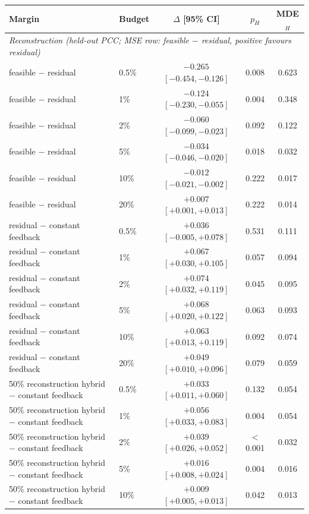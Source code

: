 \begin{tabular}{llccc}
\toprule
Margin & Budget & $\Delta$ [95\% CI] & $p_H$ & MDE$_H$ \\
\midrule
\multicolumn{5}{l}{\emph{Reconstruction (held-out PCC; MSE row: feasible $-$ residual, positive favours residual)}} \\
feasible $-$ residual & 0.5\% & $-0.265$ $[-0.454, -0.126]$ & 0.008 & 0.623 \\
feasible $-$ residual & 1\% & $-0.124$ $[-0.230, -0.055]$ & 0.004 & 0.348 \\
feasible $-$ residual & 2\% & $-0.060$ $[-0.099, -0.023]$ & 0.092 & 0.122 \\
feasible $-$ residual & 5\% & $-0.034$ $[-0.046, -0.020]$ & 0.018 & 0.032 \\
feasible $-$ residual & 10\% & $-0.012$ $[-0.021, -0.002]$ & 0.222 & 0.017 \\
feasible $-$ residual & 20\% & ${+}0.007$ $[{+}0.001, {+}0.013]$ & 0.222 & 0.014 \\
residual $-$ constant feedback & 0.5\% & ${+}0.036$ $[-0.005, {+}0.078]$ & 0.531 & 0.111 \\
residual $-$ constant feedback & 1\% & ${+}0.067$ $[{+}0.030, {+}0.105]$ & 0.057 & 0.094 \\
residual $-$ constant feedback & 2\% & ${+}0.074$ $[{+}0.032, {+}0.119]$ & 0.045 & 0.095 \\
residual $-$ constant feedback & 5\% & ${+}0.068$ $[{+}0.020, {+}0.122]$ & 0.063 & 0.093 \\
residual $-$ constant feedback & 10\% & ${+}0.063$ $[{+}0.013, {+}0.119]$ & 0.092 & 0.074 \\
residual $-$ constant feedback & 20\% & ${+}0.049$ $[{+}0.010, {+}0.096]$ & 0.079 & 0.059 \\
50\% reconstruction hybrid $-$ constant feedback & 0.5\% & ${+}0.033$ $[{+}0.011, {+}0.060]$ & 0.132 & 0.054 \\
50\% reconstruction hybrid $-$ constant feedback & 1\% & ${+}0.056$ $[{+}0.033, {+}0.083]$ & 0.004 & 0.054 \\
50\% reconstruction hybrid $-$ constant feedback & 2\% & ${+}0.039$ $[{+}0.026, {+}0.052]$ & $<$0.001 & 0.032 \\
50\% reconstruction hybrid $-$ constant feedback & 5\% & ${+}0.016$ $[{+}0.008, {+}0.024]$ & 0.004 & 0.016 \\
50\% reconstruction hybrid $-$ constant feedback & 10\% & ${+}0.009$ $[{+}0.005, {+}0.013]$ & 0.042 & 0.013 \\

\end{tabular}
